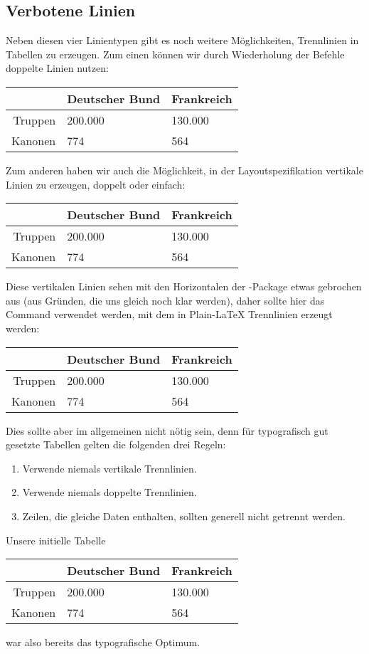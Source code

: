 \subsection{Verbotene Linien}
Neben diesen vier Linientypen gibt es noch weitere Möglichkeiten, Trennlinien in Tabellen zu erzeugen.
Zum einen können wir durch Wiederholung der Befehle doppelte Linien nutzen:
\begin{latexlisting}
	\begin{tabular}{r l l}
		\toprule
		& Deutscher Bund & Frankreich \tabularnewline \midrule \midrule
		Truppen & 200.000 & 130.000 \tabularnewline \cmidrule{2-3}
		Kanonen & 774 & 564 \tabularnewline \bottomrule
	\end{tabular}
\end{latexlisting}
Zum anderen haben wir auch die Möglichkeit, in der Layoutspezifikation vertikale Linien zu erzeugen, doppelt oder einfach:
\begin{latexlisting}
	\begin{tabular}{|r||l|l}
		\toprule
		& Deutscher Bund & Frankreich \tabularnewline \midrule \midrule
		Truppen & 200.000 & 130.000 \tabularnewline \cmidrule{2-3}
		Kanonen & 774 & 564 \tabularnewline \bottomrule
	\end{tabular}
\end{latexlisting}
Diese vertikalen Linien sehen mit den Horizontalen der -Package etwas gebrochen aus (aus Gründen, die uns gleich noch klar werden), daher sollte hier das Command  verwendet werden, mit dem in Plain-\LaTeX{} Trennlinien erzeugt werden:
\begin{latexlisting}
	\begin{tabular}{|r||l|l}
		\hline
		& Deutscher Bund & Frankreich \tabularnewline \hline \hline
		Truppen & 200.000 & 130.000 \tabularnewline \hline
		Kanonen & 774 & 564 \tabularnewline \hline
	\end{tabular}
\end{latexlisting}
Dies sollte aber im allgemeinen nicht nötig sein, denn für typografisch gut gesetzte Tabellen gelten die folgenden drei Regeln:
\begin{enumerate}
	\item Verwende niemals vertikale Trennlinien.
	\item Verwende niemals doppelte Trennlinien.
	\item Zeilen, die gleiche Daten enthalten, sollten generell nicht getrennt werden.
\end{enumerate}
Unsere initielle Tabelle
\begin{latexlisting}
	\begin{tabular}{r l l}
		\toprule
		& Deutscher Bund & Frankreich \tabularnewline \midrule
		Truppen & 200.000 & 130.000 \tabularnewline 
		Kanonen & 774 & 564 \tabularnewline \bottomrule
	\end{tabular}
\end{latexlisting}
war also bereits das typografische Optimum.

